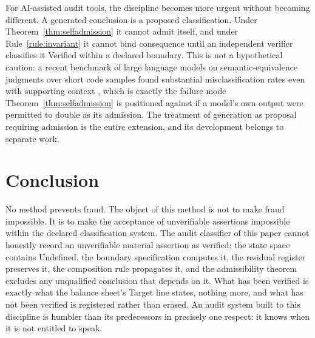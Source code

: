 \documentclass[smallcondensed,envcountsect,natbib]{svjour3}
\newcommand{\state}[1]{\textsf{#1}}
\begin{document}
For AI-assisted audit tools, the discipline becomes more urgent without becoming different. A generated conclusion is a proposed classification. Under Theorem~\ref{thm:selfadmission} it cannot admit itself, and under Rule~\ref{rule:invariant} it cannot bind consequence until an independent verifier classifies it \state{Verified} within a declared boundary. This is not a hypothetical caution: a recent benchmark of large language models on semantic-equivalence judgments over short code samples found substantial misclassification rates even with supporting context \citep{laneve2026}, which is exactly the failure mode Theorem~\ref{thm:selfadmission} is positioned against if a model's own output were permitted to double as its admission. The treatment of generation as proposal requiring admission is the entire extension, and its development belongs to separate work.

\section{Conclusion}
\label{sec:conclusion}

No method prevents fraud. The object of this method is not to make fraud impossible. It is to make the acceptance of unverifiable assertions impossible within the declared classification system. The audit classifier of this paper cannot honestly record an unverifiable material assertion as verified: the state space contains \state{Undefined}, the boundary specification computes it, the residual register preserves it, the composition rule propagates it, and the admissibility theorem excludes any unqualified conclusion that depends on it. What has been verified is exactly what the balance sheet's Target line states, nothing more, and what has not been verified is registered rather than erased. An audit system built to this discipline is humbler than its predecessors in precisely one respect: it knows when it is not entitled to speak.
\end{document}
